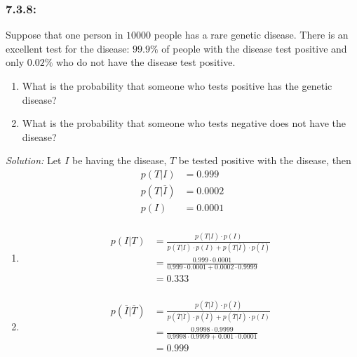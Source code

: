 \documentclass[a4paper]{article}
\begin{document}
\subsubsection*{7.3.8:}
Suppose that one person in $10000$ people has a rare genetic disease. There is an excellent test for the disease: $99.9\%$ of people with the disease test positive and only $0.02\%$ who do not have the disease test positive.
\begin{enumerate}[label = \textbf{\alph*)}]
	\item What is the probability that someone who tests positive has the genetic disease?
	\item What is the probability that someone who tests negative does not have the disease?
\end{enumerate}
\emph{Solution:}
Let $I$ be having the disease, $T$ be tested positive with the disease, then
\begin{align*}
	p(T|I)            & = 0.999  \\
	p(T|\overline{I}) & = 0.0002 \\
	p(I)              & = 0.0001 \\
\end{align*}
\begin{enumerate}[label = \textbf{\alph*)}]
	\item 
	      \begin{align*}
		      p(I|T) & = \frac{p(T|I) \cdot p(I)}{p(T|I) \cdot p(I) + p(T|\overline{I}) \cdot p(\overline{I})} \\
		             & = \frac{0.999 \cdot 0.0001}{0.999 \cdot 0.0001 + 0.0002 \cdot 0.9999}                   \\
		             & = 0.333                                                                                 \\
	      \end{align*}
	\item 
	      \begin{align*}
		      p(\overline{I}|\overline{T}) & = \frac{p(\overline{T}|\overline{I}) \cdot p(\overline{I})}{p(\overline{T}|\overline{I}) \cdot p(\overline{I}) + p(\overline{T}|I) \cdot p(I)} \\
		                                   & = \frac{0.9998 \cdot 0.9999}{0.9998 \cdot 0.9999 + 0.001 \cdot 0.0001}                                                                         \\
		                                   & = 0.999                                                                                                                                        \\
	      \end{align*}
\end{enumerate}
\end{document}
